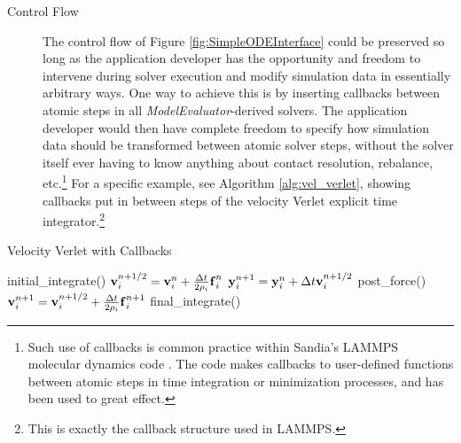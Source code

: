 \documentclass[pdf,ps2pdf,12pt,report]{SANDreport}
\theoremstyle{plain}
\theoremstyle{definition}
\theoremstyle{remark}
\numberwithin{equation}{section}
\newcommand{\bdf}{\ensuremath{\mbox{\textbf{f}}}}
\newcommand{\bdy}{\ensuremath{\mbox{\textbf{y}}}}
\newcommand{\bdv}{\ensuremath{\mbox{\textbf{v}}}}
\begin{document}
\begin{description}
  \item[Control Flow] The control flow of Figure \ref{fig:SimpleODEInterface} could be preserved so long as the application developer has the opportunity and freedom to intervene during solver execution and modify simulation data in essentially arbitrary ways. One way to achieve this is by inserting callbacks between atomic steps in all \emph{ModelEvaluator}-derived solvers. The application developer would then have complete freedom to specify how simulation data should be transformed between atomic solver steps, without the solver itself ever having to know anything about contact resolution, rebalance, etc.\footnote{Such use of callbacks is common practice within Sandia's LAMMPS molecular dynamics code \cite{Plimpton:LAMMPS:1995}. The code makes callbacks to user-defined functions between atomic steps in time integration or minimization processes, and has been used to great effect.} For a specific example, see Algorithm \ref{alg:vel_verlet}, showing callbacks put in between steps of the velocity Verlet explicit time integrator.\footnote{This is exactly the callback structure used in LAMMPS.}
\end{description}

\begin{algorithm}
\caption{Velocity Verlet with Callbacks} \label{alg:vel_verlet}
\begin{algorithmic}[1]
   \STATE initial\_integrate()
   \STATE $\bdv_i^{n + 1/2} = \bdv_i^n + \frac{\Delta t}{2 \rho_i} \bdf_i^n$
   \STATE $\bdy_i^{n+1}     = \bdy_i^n + \Delta t \bdv_i^{n + 1/2}$
   \STATE post\_force()
   \STATE $\bdv_i^{n+1} = \bdv_i^{n+1/2} + \frac{\Delta t}{2 \rho_i} \bdf_i^{n+1}$
   \STATE final\_integrate()
\end{algorithmic}
\end{algorithm}

    \nocite{*}


    \clearpage
    \providecommand*{\phantomsection}{}
    \phantomsection
    
    





    
\end{document}
